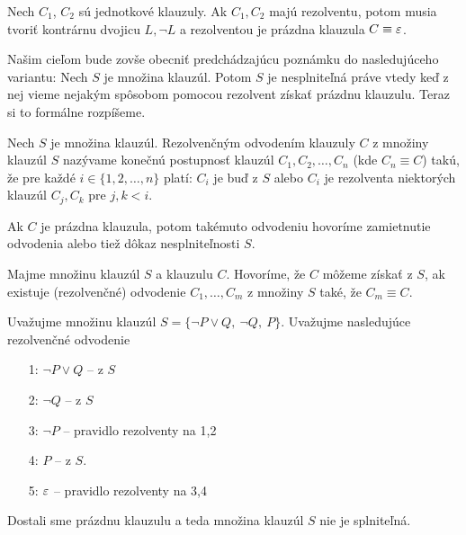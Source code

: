 \begin{poznamka}
    Nech $C_1$, $C_2$ sú jednotkové klauzuly. Ak $C_1,C_2$ majú
    rezolventu, potom musia tvoriť kontrárnu dvojicu $L, \neg L$
    a rezolventou je prázdna klauzula $C \equiv \varepsilon$.
\end{poznamka}

Našim cieľom bude zovše obecniť predchádzajúcu poznámku do
nasledujúceho variantu: Nech $S$ je množina klauzúl. Potom $S$ je
nesplniteľná práve vtedy keď z nej vieme nejakým spôsobom pomocou
rezolvent získať prázdnu klauzulu.
Teraz si to formálne rozpíšeme.

\begin{definicia}
    Nech $S$ je množina klauzúl.
    Rezolvenčným odvodením klauzuly $C$ z množiny klauzúl $S$
    nazývame konečnú postupnosť klauzúl $C_1, C_2, \ldots, C_n$ 
    (kde $C_n \equiv C$) takú,
    že pre každé $i \in \{1,2,\dots,n\}$ platí:
    $C_i$ je buď z $S$ alebo $C_i$ je rezolventa niektorých klauzúl
    $C_j, C_k$ pre $j, k < i$.

    Ak $C$ je prázdna klauzula, potom takémuto odvodeniu hovoríme 
    zamietnutie odvodenia alebo tiež dôkaz nesplniteľnosti $S$.
\end{definicia}

\begin{definicia}
    Majme množinu klauzúl $S$ a klauzulu $C$.
    Hovoríme, že $C$ môžeme získať z $S$,
    ak existuje (rezolvenčné) odvodenie $C_1, \dots, C_m$ z množiny $S$ také, že
    $C_m \equiv C$.
\end{definicia}

\begin{priklad}
    Uvažujme množinu klauzúl $S=\{\neg P \lor Q,\ \neg Q,\ P\}$.
    Uvažujme nasledujúce rezolvenčné odvodenie
    \begin{itemize} 
	\item[1:] $ \neg P \lor Q $  -- z $S$
	\item[2:] $ \neg Q $ -- z $S$
	\item[3:] $ \neg P $ -- pravidlo rezolventy na 1,2
	\item[4:] $ P $ -- z $S$.
        \item[5:] $\varepsilon$ -- pravidlo rezolventy na 3,4
    \end{itemize}
    Dostali sme prázdnu klauzulu a teda množina klauzúl $S$ nie je
    splniteľná.
\end{priklad}

